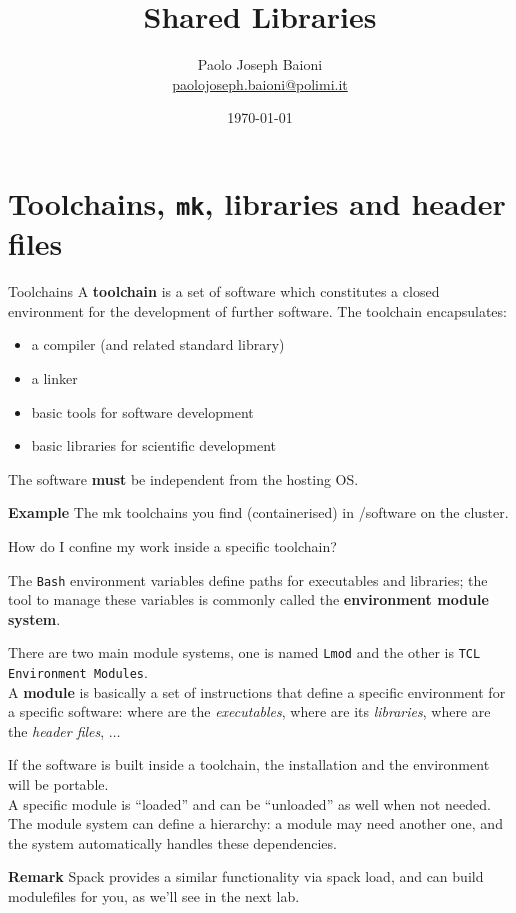 \documentclass[10pt,aspectratio=169]{beamer}
\begin{document}
\section{Toolchains, \texttt{mk}, libraries and header files}
\title{Shared Libraries}
\author{Paolo Joseph Baioni\\ \href{mailto:paolojoseph.baioni@polimi.it}{\color{blue}paolojoseph.baioni@polimi.it}}
\date{\today}

\begin{frame}
  \maketitle
\end{frame}

\begin{frame}{Toolchains}
    A \textbf{toolchain} is a set of software which constitutes a closed environment for the development of further software.
    The toolchain encapsulates:
  \begin{itemize}
      \item a compiler (and related standard library)
  \item a linker
  \item basic tools for software development
  \item basic libraries for scientific development
  \end{itemize}	

    The software \textbf{must} be independent from the hosting OS.

    \vfill
    \textbf{Example} The {\ttfamily mk} toolchains you find (containerised) in {\ttfamily /software} on the cluster.
\end{frame}

\begin{frame}{How do I confine my work inside a specific toolchain?}

    The \texttt{Bash} environment variables define paths for executables and libraries; the tool to manage these variables is commonly called the \textbf{environment module system}.

  There are two main module systems, one is named \texttt{Lmod} and the other is \texttt{TCL Environment Modules}.\\[3mm]

    A \textbf{module} is basically a set of instructions that define a specific environment for a specific software: where are the \textit{executables}, where are its \textit{libraries}, where are the \textit{header files}, $\dots$

    {If the software is built inside a toolchain, the installation and the environment  will be portable.} \\[3mm]

A specific module is “loaded” and can be “unloaded” as well when not needed.
The module system can define a hierarchy: a module may need another one, and the system automatically handles these dependencies.

    \vfill
    \textbf{Remark} {\ttfamily Spack} provides a similar functionality via {\ttfamily spack load}, and can build modulefiles for you, as we'll see in the next lab.
\end{frame}
\end{document}
